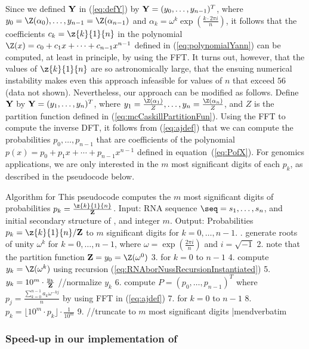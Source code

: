 Since we defined $\bf Y$ in (\ref{eq:defY}) by ${\bf Y} =
(y_0,\ldots,y_{n-1})^T$, where
$y_0=\Z(\alpha_0),\ldots, y_{n-1}=\Z(\alpha_{n-1})$ and $\alpha_k = \omega^k
\exp(\frac{k \cdot 2\pi i}{n})$, it follows that the coefficients
$c_k=\z{k}{1}{n}$ in the polynomial
$\Z(x) = c_0 + c_1 x + \cdots + c_{n-1} x^{n-1}$ defined in
(\ref{eq:polynomialYann}) can be computed, at least in principle,
by using the FFT. It turns out, however, that the values of
$\z{k}{1}{n}$ are so astronomically large, that the ensuing numerical
instability makes even this approach infeasible for values of $n$
that exceed $56$ (data not shown).
Nevertheless, our approach can be modified as follows.
Define $\bf Y$ by ${\bf Y} = (y_1,\ldots,y_n)^T$, where
$y_1=\frac{\Z(\alpha_1)}{Z},\ldots, y_{n}=\frac{\Z(\alpha_{n})}{Z}$, and
$Z$ is the partition function defined in (\ref{eq:mcCaskillPartitionFun}).
Using the FFT to compute the inverse DFT, it follows from
(\ref{eq:ajdef}) that we can compute the probabilities $p_0,\ldots,p_{n-1}$
that are coefficients of the polynomial
$p(x)=p_0+p_1 x + \cdots + p_{n-1}x^{n-1}$
defined in equation~(\ref{eq:PofX}). For genomics applications, we are
only interested in the $m$ most significant digits of each $p_k$, as described
in the pseudocode below.
\medskip

\noindent
{\sc Algorithm} for \fftbor\hfill\break
This pseudocode computes the $m$ most significant digits
of probabilities $p_k = \frac{\z{k}{1}{n}}{{\bf Z}}$. \hfill\break
{\sc Input:} RNA sequence $\seq=s_1,\ldots,s_n$, and initial secondary
structure \strSt of \seq, and integer $m$. \hfill\break
{\sc Output:} Probabilities $p_k=\z{k}{1}{n}/{\bf Z}$ to $m$ significant digits for $k=0,\ldots,n-1$. \hfill\break
\smallskip
{}.  generate roots of unity $\omega^k$ for $k=0,\ldots,n-1$, where $\omega=\exp(\frac{2 \pi i}{n})$ and $i=\sqrt{-1}$
2.  note that the partition function ${\bf Z}=y_0=\Z(\omega^0)$
3.  for $k=0$ to $n-1$
4.    compute $y_k = \Z(\omega^k)$ using recursion (\ref{eq:RNAborNussRecursionInstantiated})
5.    $y_k = 10^m \cdot \frac{y_k}{{\bf Z}}$ //normalize $y_k$
6.  compute $P = (p_0,\ldots,p_{n-1})^T$ where $p_j =\frac{\sum_{k=0}^{n-1} a_k \omega^{-kj}}{n}$ by using FFT in (\ref{eq:ajdef})
7.  for $k=0$ to $n-1$
8.    $p_k = \lfloor 10^m \cdot p_k \rfloor \cdot \frac{1}{10^m}$
9.    //truncate to $m$ most significant digits
|mendverbatim
\medskip

\subsubsection*{Speed-up in our implementation of \fftbor}

